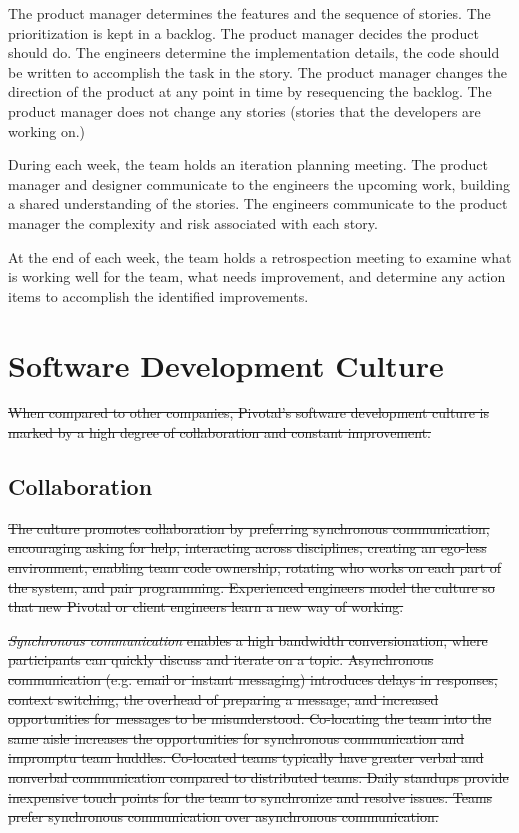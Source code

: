 The product manager determines the features and the sequence of stories. The prioritization is kept in a backlog. The product manager decides  the product should do. The engineers determine the implementation details,  the code should be written to accomplish the task in the story. The product manager changes the direction of the product at any point in time by resequencing the backlog. The product manager does not change any  stories (stories that the developers are working on.)


During each week, the team holds an iteration planning meeting. The product manager and designer communicate to the engineers the upcoming work, building a shared understanding of the stories. The engineers communicate to the product manager the complexity and risk associated with each story.


At the end of each week, the team holds a retrospection meeting to examine what is working well for the team, what needs improvement, and determine any action items to accomplish the identified improvements.






\section{Software Development Culture}
\sout{When compared to other companies, Pivotal’s software development culture is marked by a high degree of collaboration and constant improvement.}


\subsection{Collaboration}
\sout{The culture promotes collaboration by preferring synchronous communication, encouraging asking for help, interacting across disciplines, creating an ego-less environment, enabling team code ownership, rotating who works on each part of the system, and pair programming. Experienced engineers model the culture so that new Pivotal or client engineers learn a new way of working.}


\sout{\textit{Synchronous communication} enables a high bandwidth conversionation, where participants can quickly discuss and iterate on a topic. Asynchronous communication (e.g. email or instant messaging) introduces delays in responses, context switching, the overhead of preparing a message, and increased opportunities for messages to be misunderstood. Co-locating the team into the same aisle increases the opportunities for synchronous communication and impromptu team huddles.  Co-located teams typically have greater verbal and nonverbal communication compared to distributed teams. Daily standups provide inexpensive touch points for the team to synchronize and resolve issues. Teams prefer synchronous communication over asynchronous communication. }


